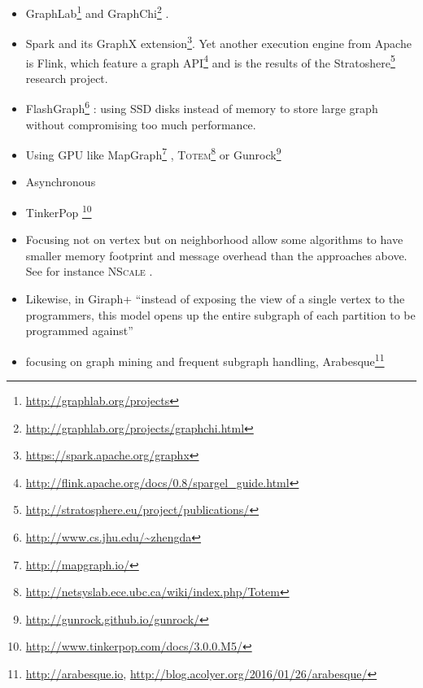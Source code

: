 \begin{itemize}
	\item
		GraphLab\footnote{\href{http://graphlab.org/projects/source.html}{http://graphlab.org/projects}}%
		\autocites{Low2010}{Gonzalez2012}{Low2012}{GraphLab13Low} and
		GraphChi\footnote{\href{http://graphlab.org/projects/graphchi.html}{http://graphlab.org/projects/graphchi.html}}
		\autocite{Kyrola2012}.
	\item
		Spark \autocite{Zaharia2010} and its GraphX
		extension\footnote{\href{https://spark.apache.org/graphx}{https://spark.apache.org/graphx}}.
		Yet another execution engine from Apache is Flink,  which feature a
		graph
		API\footnote{\href{http://flink.apache.org/docs/0.8/spargel_guide.html}%
			{http://flink.apache.org/docs/0.8/spargel\_guide.html}} and is the
		results of the Stratoshere\footnote{\href{http://stratosphere.eu/project/publications/}%
			{http://stratosphere.eu/project/publications/}} research project.
	\item FlashGraph\footnote{\href{http://www.cs.jhu.edu/~zhengda/\#FlashGraph}%
			{\url{http://www.cs.jhu.edu/~zhengda}}} \autocite{FlashGraph14}:
		using SSD disks instead of memory to store large graph without
		compromising too much performance.
	\item Using GPU like MapGraph\footnote{\href{http://mapgraph.io/}{http://mapgraph.io/}}
		\autocite{Fu2014},
		\textsc{Totem}\footnote{\href{http://netsyslab.ece.ubc.ca/wiki/index.php/Totem}%
			{http://netsyslab.ece.ubc.ca/wiki/index.php/Totem}}
		\autocite{Gharaibeh2013} or
		Gunrock\footnote{\href{http://gunrock.github.io/gunrock/}%
			{http://gunrock.github.io/gunrock/}} \autocite{Gunrock15}
	\item Asynchronous \autocite{Wang2013}
	\item TinkerPop \footnote{\href{http://www.tinkerpop.com/docs/3.0.0.M5/}%
			{http://www.tinkerpop.com/docs/3.0.0.M5/}}
	\item Focusing not on vertex but on neighborhood allow some algorithms to
		have smaller memory footprint and message overhead than the approaches
		above. See for instance \textsc{NScale} \autocite{Quamar2014}.
	\item Likewise, in Giraph+ \autocite{Tian2013} \enquote{instead of
		exposing the view of a single vertex to the programmers, this
		model opens up the entire subgraph of each partition to be
		programmed against}
	\item focusing on graph mining and frequent subgraph handling,
		Arabesque\footnote{\url{http://arabesque.io},
		\url{http://blog.acolyer.org/2016/01/26/arabesque/}}\autocite{Teixeira2015}
\end{itemize}


